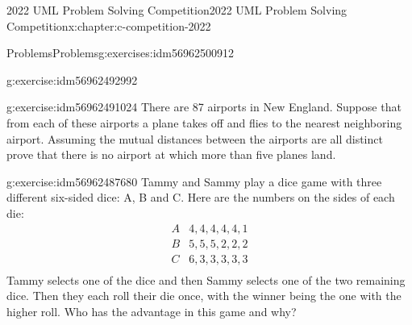 \documentclass[twoside,10pt,]{book}
\numberwithin{equation}{section}
\providecommand\phantomsection{}
\begin{document}
\begin{chapterptx}{2022 UML Problem Solving Competition}{}{2022 UML Problem Solving Competition}{}{}{x:chapter:c-competition-2022}
\begin{exercises-section}{Problems}{}{Problems}{}{}{g:exercises:idm56962500912}
\begin{divisionexercise}{4}{}{}{g:exercise:idm56962492992}
\end{divisionexercise}%
\begin{divisionexercise}{5}{}{}{g:exercise:idm56962491024}%
There are 87 airports in New England. Suppose that from each of these airports a plane takes off and flies to the nearest neighboring airport. Assuming the mutual distances between the airports are all distinct prove that there is no airport at which more than five planes land.%
\end{divisionexercise}%
\begin{divisionexercise}{6}{}{}{g:exercise:idm56962487680}%
Tammy and Sammy play a dice game with three different six-sided dice: A, B and C. Here are the numbers on the sides of each die:%
\begin{equation*}
\begin{array}{cc}
A & 4, 4, 4, 4, 4, 1 \\
B & 5, 5, 5, 2, 2, 2 \\
C & 6, 3, 3, 3, 3, 3 \\
\end{array}
\end{equation*}
Tammy selects one of the dice and then Sammy selects one of the two remaining dice.  Then they each roll their die once, with the winner being the one with the higher roll.   Who has the advantage in this game and why?%
\end{divisionexercise}%
\end{exercises-section}
\end{chapterptx}
%
\appendix%
%
\clearpage\phantomsection%
%
%
%
\typeout{************************************************}
\typeout{************************************************}
%
\end{document}
